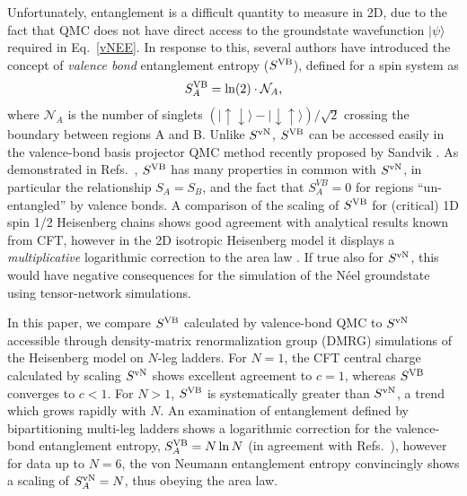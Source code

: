 \documentclass[prl,aps,twocolumn,floatfix,amsmath,amssymb,superscriptaddress,tightenlines]{revtex4}
\begin{document}
Unfortunately, entanglement is a difficult quantity to
measure in 2D, due to the fact that QMC 
does not have
direct access to the groundstate wavefunction $| \psi \rangle$ required
in Eq.~\eqref{vNEE}.  In response to this, several authors \cite{Alet,
Chh} have introduced the concept of {\it valence bond}
entanglement entropy ($S^{\rm VB}$), defined for a  spin system as
\begin{equation} 
S^{\rm VB}_A = \ln(2) \cdot \mathcal{N}_A, \label{VBEE}
\end{equation} 
where $ \mathcal{N}_A$ is the number of singlets
${( |\uparrow \downarrow \rangle - | \downarrow \uparrow
\rangle)/\sqrt{2}}$ crossing the boundary between regions A and B.  Unlike
$S^{ \rm vN}$, $S^{\rm VB}$ can be accessed easily in the valence-bond basis
projector QMC method recently proposed by Sandvik \cite{Sandvik}.  As
demonstrated in Refs.~\cite{Alet,Chh}, $S^{\rm VB}$ has many properties in
common with $S^{ \rm vN}$, in particular the relationship $S_A = S_B$, and the
fact that $S^{VB}_A=0$ for regions ``un-entangled'' by valence bonds.
A comparison of the scaling of $S^{\rm VB}$ for (critical) 1D spin
1/2 Heisenberg chains shows good agreement with analytical results known
from CFT, however in the
 2D isotropic Heisenberg model it
displays a {\it multiplicative} logarithmic correction to the area law \cite{Alet,Chh}.  If
true also for $S^{ \rm vN}$, this would have negative consequences for the simulation of the 
N\'eel groundstate using tensor-network simulations.

 
In this paper, we compare $S^{\rm VB}$ calculated by valence-bond QMC to 
$S^{ \rm vN}$ accessible through density-matrix renormalization group
(DMRG) simulations of the Heisenberg model on $N$-leg ladders.    For $N=1$, the CFT central charge calculated  by scaling
$S^{ \rm vN}$ shows excellent agreement to $c=1$, whereas $S^{\rm VB}$ converges
to $c<1$.
For $N>1$, $S^{\rm VB}$ is systematically greater than $S^{ \rm vN}$,
a trend which grows rapidly with $N$. An
examination of entanglement defined by bipartitioning multi-leg ladders
shows a logarithmic correction for the valence-bond entanglement entropy, $S^{\rm VB}_A = N \ln
N$ (in agreement with Refs.~\cite{Alet,Chh}), however for data up to
$N=6$, the von Neumann entanglement entropy  convincingly shows a scaling of
$S^{\rm vN}_A = N$, thus obeying the area law.
\end{document}
